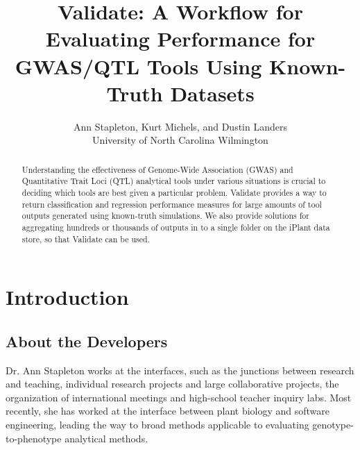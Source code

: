 \documentclass[twoside,a4paper]{refart}
\title{Validate: A Workflow for Evaluating Performance for GWAS/QTL Tools Using Known-Truth Datasets}
\author{Ann Stapleton, Kurt Michels, and Dustin Landers \\
University of North Carolina Wilmington \\
}
\date{}
\begin{document}
\maketitle

\begin{abstract}
        Understanding the effectiveness of Genome-Wide Association (GWAS) and Quantitative Trait Loci (QTL) analytical tools under various situations is crucial to deciding which tools are best given a particular problem. Validate provides a way to return classification and regression performance measures for large amounts of tool outputs generated using known-truth simulations. We also provide solutions for aggregating hundreds or thousands of outputs in to a single folder on the iPlant data store, so that Validate can be used.\end{abstract}

\tableofcontents

\newpage


\begin{center}
\end{center}

\section{Introduction}

\subsection{About the Developers}

Dr. Ann Stapleton works at the interfaces, such as the junctions between research and teaching, individual research projects and large collaborative projects, the organization of international meetings and high-school teacher inquiry labs. Most recently, she has worked at the interface between plant biology and software engineering, leading the way to broad methods applicable to evaluating genotype-to-phenotype analytical methods.
\end{document}
